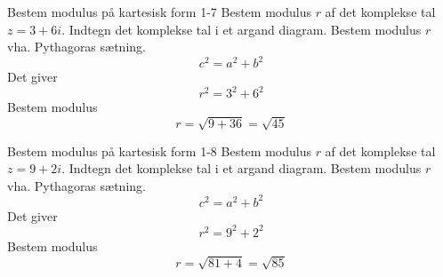 \documentclass{article}
\begin{document}
\newpage
\begin{exercise}{Bestem modulus på kartesisk form 1-7}
Bestem modulus $r$ af det komplekse tal $z = 3 + 6i$.
\hint
Indtegn det komplekse tal i et argand diagram.
\hint
Bestem modulus $r$ vha. Pythagoras sætning.
\[c^2 = a^2 + b^2
\]
\hint
Det giver
\[r^2 = 3^2 + 6^2
\]
\hint
Bestem modulus
\[r = \sqrt{9 + 36} = \sqrt{45}
\]
\end{exercise}
\newpage
\begin{exercise}{Bestem modulus på kartesisk form 1-8}
Bestem modulus $r$ af det komplekse tal $z = 9 + 2i$.
\hint
Indtegn det komplekse tal i et argand diagram.
\hint
Bestem modulus $r$ vha. Pythagoras sætning.
\[c^2 = a^2 + b^2
\]
\hint
Det giver
\[r^2 = 9^2 + 2^2
\]
\hint
Bestem modulus
\[r = \sqrt{81 + 4} = \sqrt{85}
\]
\end{exercise}
\end{document}
